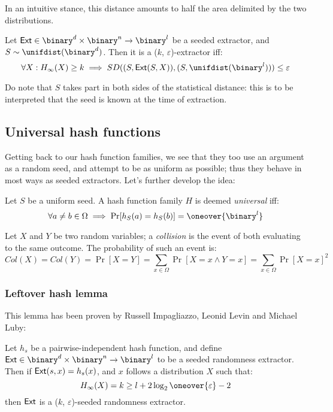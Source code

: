 In an intuitive stance, this distance amounts to half the area delimited by the two distributions.


\begin{definition}
    Let $\ext \in \binary^d \times \binary^n \to \binary^l$ be a seeded extractor, and $S \sim \unifdist(\binary^d)$. Then it is a ($k$, $\varepsilon$)-extractor iff:
    \[
        \forall X : H_{\infty}(X) \geq k \implies SD((S, \ext(S, X)), (S, \unifdist(\binary^l))) \leq \varepsilon
    \]
\end{definition}

Do note that $S$ takes part in both sides of the statistical distance: this is to be interpreted that the seed is known at the time of extraction.

\subsection{Universal hash functions}

Getting back to our hash function families, we see that they too use an argument as a random seed, and attempt to be as uniform as possible; thus they behave in most ways as seeded extractors. Let's further develop the idea:

\begin{definition}
    Let $S$ be a uniform seed. A hash function family $H$ is deemed \emph{universal} iff:
    \[
        \forall a \neq b \in \Omega \implies \Pr[h_S(a) = h_S(b)] = \oneover{\binary^l}
    \]
\end{definition}

\begin{definition}
    Let $X$ and $Y$ be two \iid{} random variables; a \emph{collision} is the event of both evaluating to the same outcome. The probability of such an event is:
    \[
        Col(X) = Col(Y) = \Pr[X = Y] = \sum_{x \in \Omega}\Pr[X = x \wedge Y = x] = \sum_{x \in \Omega}\Pr[X = x]^2
    \]
\end{definition}

\subsubsection{Leftover hash lemma}

This lemma has been proven by Russell Impagliazzo, Leonid Levin and Michael Luby:

\begin{lemma}
    Let $h_s$ be a pairwise-independent hash function, and define $\ext \in \binary^d \times \binary^n \to \binary^l$ to be a seeded randomness extractor. Then if $\textup{\textsf{Ext}}(s, x) = h_s(x)$, and $x$ follows a distribution $X$ such that:
    \[
        H_\infty(X) = k \geq l + 2\log_2\oneover{\varepsilon} - 2
    \]
    then $\textup{\textsf{Ext}}$ is a ($k$, $\varepsilon$)-seeded randomness extractor.
\end{lemma}


